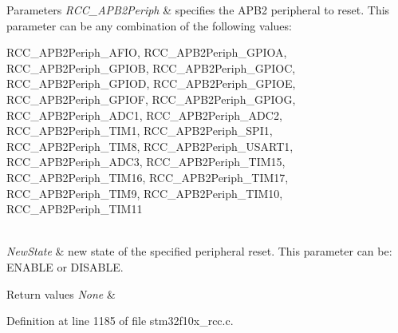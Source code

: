\begin{DoxyParams}{Parameters}
{\em R\+C\+C\+\_\+\+A\+P\+B2\+Periph} & specifies the A\+P\+B2 peripheral to reset. This parameter can be any combination of the following values\+: \begin{DoxyItemize}
\item R\+C\+C\+\_\+\+A\+P\+B2\+Periph\+\_\+\+A\+F\+IO, R\+C\+C\+\_\+\+A\+P\+B2\+Periph\+\_\+\+G\+P\+I\+OA, R\+C\+C\+\_\+\+A\+P\+B2\+Periph\+\_\+\+G\+P\+I\+OB, R\+C\+C\+\_\+\+A\+P\+B2\+Periph\+\_\+\+G\+P\+I\+OC, R\+C\+C\+\_\+\+A\+P\+B2\+Periph\+\_\+\+G\+P\+I\+OD, R\+C\+C\+\_\+\+A\+P\+B2\+Periph\+\_\+\+G\+P\+I\+OE, R\+C\+C\+\_\+\+A\+P\+B2\+Periph\+\_\+\+G\+P\+I\+OF, R\+C\+C\+\_\+\+A\+P\+B2\+Periph\+\_\+\+G\+P\+I\+OG, R\+C\+C\+\_\+\+A\+P\+B2\+Periph\+\_\+\+A\+D\+C1, R\+C\+C\+\_\+\+A\+P\+B2\+Periph\+\_\+\+A\+D\+C2, R\+C\+C\+\_\+\+A\+P\+B2\+Periph\+\_\+\+T\+I\+M1, R\+C\+C\+\_\+\+A\+P\+B2\+Periph\+\_\+\+S\+P\+I1, R\+C\+C\+\_\+\+A\+P\+B2\+Periph\+\_\+\+T\+I\+M8, R\+C\+C\+\_\+\+A\+P\+B2\+Periph\+\_\+\+U\+S\+A\+R\+T1, R\+C\+C\+\_\+\+A\+P\+B2\+Periph\+\_\+\+A\+D\+C3, R\+C\+C\+\_\+\+A\+P\+B2\+Periph\+\_\+\+T\+I\+M15, R\+C\+C\+\_\+\+A\+P\+B2\+Periph\+\_\+\+T\+I\+M16, R\+C\+C\+\_\+\+A\+P\+B2\+Periph\+\_\+\+T\+I\+M17, R\+C\+C\+\_\+\+A\+P\+B2\+Periph\+\_\+\+T\+I\+M9, R\+C\+C\+\_\+\+A\+P\+B2\+Periph\+\_\+\+T\+I\+M10, R\+C\+C\+\_\+\+A\+P\+B2\+Periph\+\_\+\+T\+I\+M11 \end{DoxyItemize}
\\
\hline
{\em New\+State} & new state of the specified peripheral reset. This parameter can be\+: E\+N\+A\+B\+LE or D\+I\+S\+A\+B\+LE. \\
\hline
\end{DoxyParams}

\begin{DoxyRetVals}{Return values}
{\em None} & \\
\hline
\end{DoxyRetVals}


Definition at line 1185 of file stm32f10x\+\_\+rcc.\+c.

